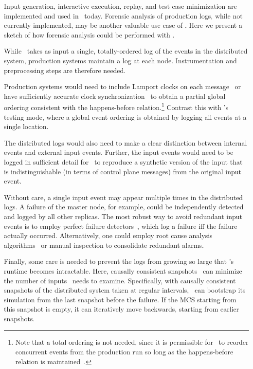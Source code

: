 Input generation, interactive execution, replay, and test case
minimization are implemented and used in \projectname~today.
Forensic analysis of production logs, while not currently implemented,
may be another valuable use case of \projectname. Here we present a sketch of
how forensic analysis could be performed with \simulator.

While \simulator~takes as input a single, totally-ordered log of the events in the
distributed system, production systems maintain a log at each node.
Instrumentation and preprocessing steps are therefore needed.

Production systems would need to include Lamport
clocks on each message~\cite{Lamport:1978:TCO:359545.359563} or have
sufficiently accurate clock
synchronization~\cite{corbett2012spanner} to obtain a partial global ordering
consistent with the happens-before relation.\footnote{
Note that a total ordering is not needed, since it is permissible
for \simulator~to reorder concurrent events from
the production run so long as the happens-before relation is
maintained~\cite{Fischer:1985:IDC:3149.214121}.}
 Contrast this with \projectname's
testing mode, where a global event ordering is obtained by logging all events at a single location.

The distributed logs would also need to make a clear distinction between
internal events and external input events. Further,
the input events would need to be logged in sufficient detail for \projectname~to
reproduce a synthetic version of the input that is indistinguishable (in terms
of control plane messages) from the original input event.

Without care, a single input event may appear multiple times in the
distributed logs. A failure of the master node, for example, could be independently
detected and logged by all other replicas. The most robust way to
avoid redundant input events is to employ perfect failure
detectors~\cite{chandra1996unreliable}, which log a failure iff
the failure actually occurred. %
Alternatively, one
could employ root cause analysis
algorithms~\cite{yemini1996} or manual inspection to consolidate redundant
alarms.

Finally, some care is needed to prevent the logs from growing so large that
\simulator's runtime becomes intractable. Here, causally consistent
snapshots~\cite{Chandy:1985:DSD:214451.214456} can minimize the number of inputs \simulator~needs
to examine. Specifically, with causally consistent snapshots of the distributed
system taken at regular intervals, \projectname~can bootstrap its simulation from the last snapshot before the failure.
If the MCS starting from this snapshot is empty, it can iteratively move backwards, starting from earlier
snapshots.


